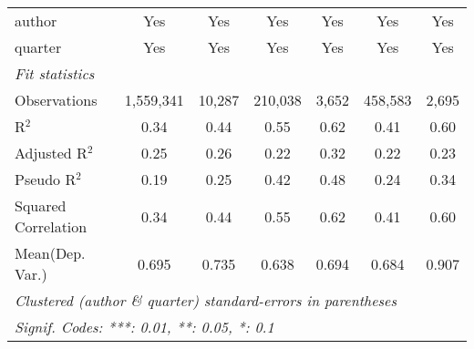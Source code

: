\begin{tabular}{lcccccc}
   author                                                     & Yes            & Yes          & Yes           & Yes          & Yes            & Yes\\  
   quarter                                                    & Yes            & Yes          & Yes           & Yes          & Yes            & Yes\\  
   \midrule
   \emph{Fit statistics}\\
   Observations                                               & 1,559,341      & 10,287       & 210,038       & 3,652        & 458,583        & 2,695\\  
   R$^2$                                                      & 0.34           & 0.44         & 0.55          & 0.62         & 0.41           & 0.60\\  
   Adjusted R$^2$                                             & 0.25           & 0.26         & 0.22          & 0.32         & 0.22           & 0.23\\  
   Pseudo R$^2$                                               & 0.19           & 0.25         & 0.42          & 0.48         & 0.24           & 0.34\\  
   Squared Correlation                                        & 0.34           & 0.44         & 0.55          & 0.62         & 0.41           & 0.60\\  
Mean(Dep. Var.) & 0.695 & 0.735 & 0.638 & 0.694 & 0.684 & 0.907 \\
   \midrule \midrule
   \multicolumn{7}{l}{\emph{Clustered (author \& quarter) standard-errors in parentheses}}\\
   \multicolumn{7}{l}{\emph{Signif. Codes: ***: 0.01, **: 0.05, *: 0.1}}\\
\end{tabular}
\par\endgroup
